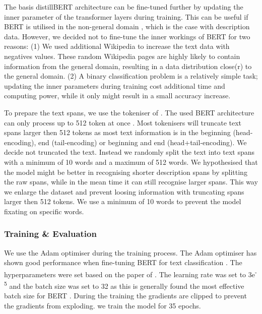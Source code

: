 \documentclass[a4paper, 12pt, oneside]{book} %
\begin{document}
The basis distillBERT architecture can be fine-tuned further by updating the inner parameter of the transformer layers during training. 
This can be useful if BERT is utilised in the non-general domain \autocite{devlin_bert_2019, sun_how_2020, sanh_distilbert_2020}, which is the case with description data.
However, we decided not to fine-tune the inner workings of BERT for two reasons: 
(1) We used additional Wikipedia to increase the text data with negatives values.
These random Wikipedia pages are highly likely to contain information from the general
domain, resulting in a  data distribution close(r) to the general domain.
(2) A binary classification problem is a relatively simple task; updating the inner parameters during training cost additional time and computing power, while it only might result in a small accuracy increase.

To prepare the text spans, we use the tokeniser of \textcite{wolf_huggingfaces_2020}.
The used BERT architecture can only process up to 512 token at once \autocite{sanh_distilbert_2020, devlin_bert_2019}.
Most tokenisers will truncate text spans larger then 512 tokens as most text information is in the beginning (head-encoding), end (tail-encoding) or beginning and end (head+tail-encoding).
We decide not truncated the text.
Instead we randomly split the text into text spans with a minimum of 10 words and a maximum of 512 words.
We hypothesised that the model might be better in recognising shorter description spans by splitting the raw spans, while in the mean time it can still recognise larger spans.  
This way we enlarge the dataset and prevent loosing information with truncating spans larger then 512 tokens. 
We use a minimum of 10 words to prevent the model fixating on specific words.


\subsubsection{Training \& Evaluation}
We use the Adam optimiser \autocite{kingma_adam_2017} during the training process.
The Adam optimiser has shown good performance when fine-tuning BERT for text classification \autocite{you_large_2020}.
The hyperparameters were set based on the paper of \textcite{sun_how_2020}.
The learning rate was set to 3e\textsuperscript{-5} and the batch size was set to 32 as this is generally found the most effective batch size for BERT \autocite{devlin_bert_2019, sanh_distilbert_2020, sun_how_2020, you_large_2020}.
During the training the gradients are clipped to prevent the gradients from exploding.
we train the model for 35 epochs.
\end{document}
